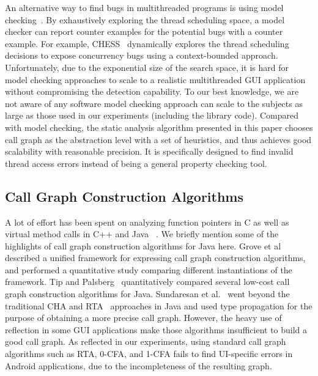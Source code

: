 An alternative way to find bugs in multithreaded programs is using model checking~\cite{Nori:2010:ESO, Inverardi:2000, Siegel:2008}.
By exhaustively exploring the thread scheduling space, a model checker can
report counter examples for the potential bugs with a counter example. For example,
CHESS~\cite{chess} dynamically explores the thread scheduling decisions to expose
concurrency bugs using a context-bounded approach. 
Unfortunately, due to the exponential size of the search space,
 it is hard for model checking approaches to scale to a realistic multithreaded GUI application
 without compromising the detection capability. To our best knowledge,
we are not aware of any software model checking approach can scale to the subjects
as large as those used in our experiments (including the library code). Compared with model checking, the static analysis
algorithm presented in this paper chooses call graph as the
abstraction level with a set of heuristics, and thus achieves good
scalability with reasonable precision. It is specifically designed to find invalid thread
access errors instead of being a general property checking tool. 


\subsection{Call Graph Construction Algorithms}

A lot of effort has been spent on analyzing function pointers in C
as well as virtual method calls in C++ and Java ~\cite{rta, kcfa,
xta, inccg, Sundaresan:2000, Might:2010}.
We briefly mention some of the highlights of call graph construction
algorithms for Java here. Grove et al~\cite{kcfa} described a unified
framework for expressing call graph construction algorithms, and
performed a quantitative study comparing different instantiations
of the framework. Tip and Palsberg~\cite{xta} quantitatively compared
several low-cost call graph construction algorithms for Java.
Sundaresan et al.~\cite{Sundaresan:2000} went beyond the traditional
CHA and RTA~\cite{rta} approaches in Java and used type propagation
for the purpose of obtaining a more precise call graph.
However, the heavy use of reflection in some GUI applications make
those algorithms insufficient to build a good call graph.
As reflected in our experiments, using standard call graph algorithms
such as RTA, 0-CFA, and 1-CFA fails to find UI-specific errors in
Android applications, due to the incompleteness of the resulting graph.


